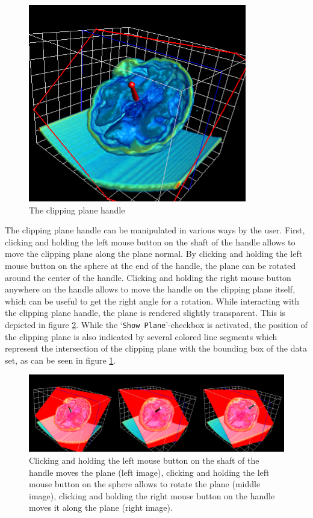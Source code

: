 \begin{figure}[htb]
 \centering
 \includegraphics[scale=0.4,keepaspectratio=true]{./images/clipplane_handle.png}
 \caption{The clipping plane handle}
 \label{fig:planemanipulation}
\end{figure}

The clipping plane handle can be manipulated in various ways by the user. First, clicking and holding the left mouse button on the
shaft of the handle allows to move the clipping plane along the plane normal. By clicking and holding the left mouse button on the 
sphere at the end of the handle, the plane can be rotated around the center of the handle. Clicking and holding the right mouse 
button anywhere on the handle allows to move the handle on the clipping plane itself, which can be useful to get the right angle for a rotation.
While interacting with the clipping plane handle, the plane is rendered slightly transparent. 
This is depicted in figure \ref{fig:clipplane_manipulation}. While the `\verb|Show Plane|'-checkbox is 
activated, the position of the clipping plane is also indicated by several colored line segments which represent the intersection 
of the clipping plane with the bounding box of the data set, as can be seen in figure \ref{fig:planemanipulation}.

\begin{figure}[h]
 \centering
 \includegraphics[scale=0.4,keepaspectratio=true]{./images/clipplane_manipulation.png}
 \caption{Clicking and holding the left mouse button on the shaft of the handle moves the plane (left image), clicking and holding the left mouse
 button on the sphere allows to rotate the plane (middle image), clicking and holding the right mouse button on the handle moves it along the plane 
 (right image).}
 \label{fig:clipplane_manipulation}
\end{figure}


